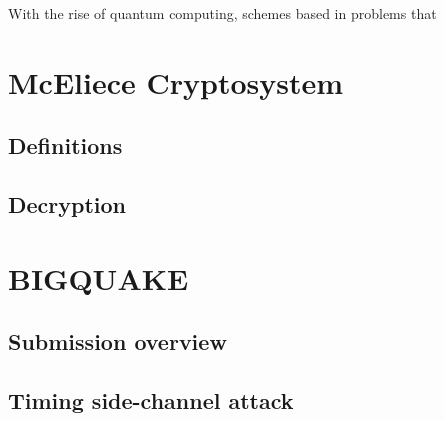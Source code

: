 With the rise of quantum computing, schemes based in problems that 

\section{McEliece Cryptosystem}
\subsection{Definitions}
\subsection{Decryption}
\section{BIGQUAKE}
\subsection{Submission overview}
\subsection{Timing side-channel attack}